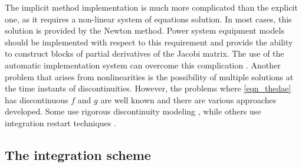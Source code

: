 \documentclass[lettersize,journal]{IEEEtran}
\begin{document}
The implicit method implementation is much more complicated than the explicit one, as it requires a non-linear system of equations solution. In most cases, this solution is provided by the Newton method. Power system equipment models should be implemented with respect to this requirement and provide the ability to construct blocks of partial derivatives of the Jacobi matrix. The use of the automatic implementation system can overcome this complication \cite{mycompiler}. Another problem that arises from nonlinearities is the possibility of multiple solutions at the time instants of discontinuities. However, the problems where \eqref{eqn_thedae} has discontinuous \(f\) and \(g\) are well known and there are various approaches developed. Some use rigorous discontinuity modeling \cite{Filippov1988}, while others use integration restart techniques \cite{cellier06}.

\subsection{The integration scheme}
\end{document}
